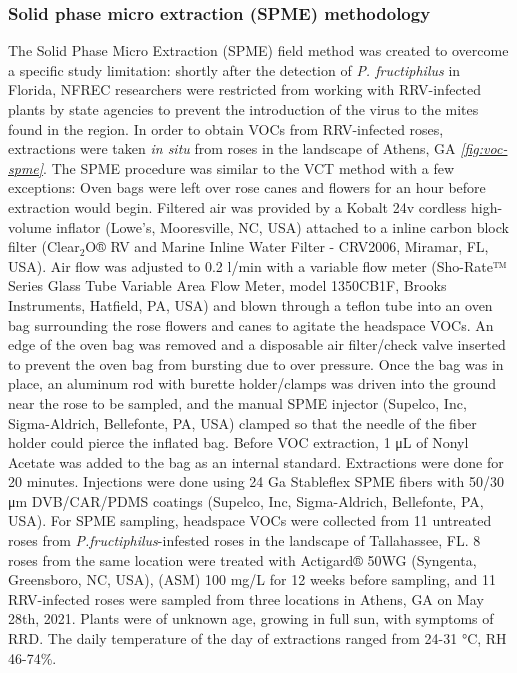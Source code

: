 \documentclass{ufdissertation}[overrideChapters] %
\begin{document}
{\hypertarget{solid-phase-micro-extraction-spme-methodology}{%
\subsubsection{Solid phase micro extraction (SPME) methodology}\label{solid-phase-micro-extraction-spme-methodology}}

The Solid Phase Micro Extraction (SPME) field method was created to overcome a specific study limitation: shortly after the detection of \emph{P. fructiphilus} in Florida, NFREC researchers were restricted from working with RRV-infected plants by state agencies to prevent the introduction of the virus to the mites found in the region. In order to obtain VOCs from RRV-infected roses, extractions were taken \emph{in situ} from roses in the landscape of Athens, GA \emph{\ref{fig:voc-spme}}. The SPME procedure was similar to the VCT method with a few exceptions: Oven bags were left over rose canes and flowers for an hour before extraction would begin. Filtered air was provided by a Kobalt 24v cordless high-volume inflator (Lowe's, Mooresville, NC, USA) attached to a inline carbon block filter (Clear\(_2\)O® RV and Marine Inline Water Filter - CRV2006, Miramar, FL, USA). Air flow was adjusted to 0.2 \si{\litre}/min with a variable flow meter (Sho-Rate™ Series Glass Tube Variable Area Flow Meter, model 1350CB1F, Brooks Instruments, Hatfield, PA, USA) and blown through a teflon tube into an oven bag surrounding the rose flowers and canes to agitate the headspace VOCs. An edge of the oven bag was removed and a disposable air filter/check valve inserted to prevent the oven bag from bursting due to over pressure. Once the bag was in place, an aluminum rod with burette holder/clamps was driven into the ground near the rose to be sampled, and the manual SPME injector (Supelco, Inc, Sigma-Aldrich, Bellefonte, PA, USA) clamped so that the needle of the fiber holder could pierce the inflated bag. Before VOC extraction, 1 \si{\micro\liter} of Nonyl Acetate was added to the bag as an internal standard. Extractions were done for 20 minutes. Injections were done using 24 Ga Stableflex SPME fibers with 50/30 \si{\micro\meter} DVB/CAR/PDMS coatings (Supelco, Inc, Sigma-Aldrich, Bellefonte, PA, USA). For SPME sampling, headspace VOCs were collected from 11 untreated roses from \emph{P.fructiphilus}-infested roses in the landscape of Tallahassee, FL. 8 roses from the same location were treated with Actigard® 50WG (Syngenta, Greensboro, NC, USA), (ASM) 100 \si{\milli\gram}/\si{\liter} for 12 weeks before sampling, and 11 RRV-infected roses were sampled from three locations in Athens, GA on May 28th, 2021. Plants were of unknown age, growing in full sun, with symptoms of RRD. The daily temperature of the day of extractions ranged from 24-31 °C, RH 46-74\%.

}
\end{document}
